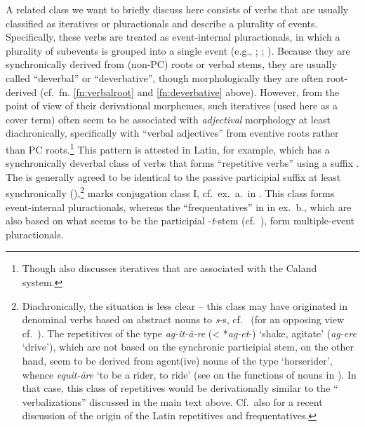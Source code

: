 \documentclass[output=paper,colorlinks,citecolor=brown]{langscibook}
\begin{document}
A related class we want to briefly discuss here consists of verbs that are usually classified as iteratives or pluractionals and describe a plurality of events. Specifically, these verbs are treated as event-internal pluractionals, in which a plurality of subevents is grouped into a  single event (e.g., \citealt{Tovena2008}; \citealt{Tovena2010}; \citealt{Greenberg2010}). Because they are synchronically derived from (non-PC) roots or verbal stems,  they are  usually called ``deverbal'' or ``deverbative'', though morphologically they are often root-derived (cf.\ fn. \ref{fn:verbalroot} and \ref{fn:deverbative} above). However, from the point of view of their derivational morphemes, such iteratives (used here as a cover term) often seem to be associated with  \emph{adjectival} morphology at least diachronically, specifically with ``verbal adjectives'' from eventive roots rather than PC roots.\footnote{Though \citet{Rau2009, Rau2013} also discusses iteratives that are associated with the Caland system.}  This pattern is attested in Latin, for example, which has a 
 synchronically deverbal   class of verbs that forms  ``repetitive verbs''   using a suffix . The  is generally agreed to be identical to the  passive participial suffix  at least synchronically (\citealt[424]{Weiss2020}),\footnote{Diachronically, the situation is less clear -- this class may have originated in  denominal verbs based on abstract nouns to \textit{s}-s, cf.\ \citealt[18 \& fn.\ 49]{Nussbaum2021spes} (for an opposing view cf.\ \citealt{DeVaan2012}). The repetitives of the type \textit{ag-it-ā-re}  (< *\textit{ag-et}-) `shake, agitate' (\textit{ag-ere}  `drive'), which are not based on the synchronic participial stem, on the other hand, seem to be derived from agent(ive) nouns of the type  `horserider', whence \textit{equit-āre}  `to be a rider, to ride' (see \citealt[260--263]{Nussbaum2017} on the functions of nouns in ). In that case, this class of repetitives would be derivationally similar to the `` verbalizations'' discussed in the main text above. Cf.\ also  \citealt[424--425]{Weiss2020} for a recent discussion of the origin of the Latin repetitives and frequentatives.}  marks conjugation class I, cf.\ ex.\ a.\ in . This class forms event-internal pluractionals, whereas the ``frequentatives'' in  in ex.\ b., which are also based on what seems to be the participial -\textit{t}-stem (cf.\ ), form multiple-event pluractionals.
\end{document}
